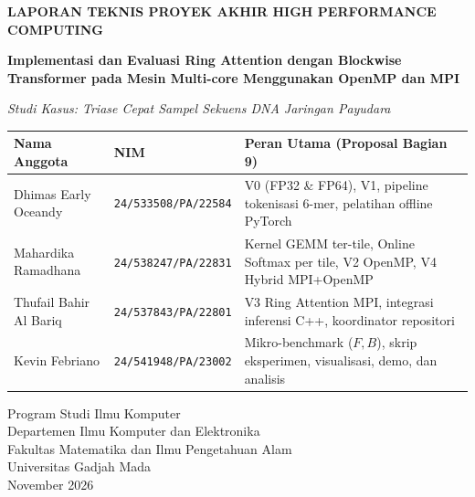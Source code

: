 \documentclass[11pt,a4paper]{article}
\begin{document}
\begin{titlepage}
\centering
\vspace*{1.5cm}
{\large\textbf{LAPORAN TEKNIS PROYEK AKHIR HIGH PERFORMANCE COMPUTING}\par}
\vspace{1.2cm}
{\LARGE\bfseries Implementasi dan Evaluasi Ring Attention dengan Blockwise Transformer pada Mesin Multi-core Menggunakan OpenMP dan MPI\par}
\vspace{0.5cm}
{\Large\itshape Studi Kasus: Triase Cepat Sampel Sekuens DNA Jaringan Payudara\par}
\vspace{1.8cm}

\begin{tabular}{llp{7.2cm}}
\toprule
\textbf{Nama Anggota} & \textbf{NIM} & \textbf{Peran Utama (Proposal Bagian 9)} \\
\midrule
Dhimas Early Oceandy & \texttt{24/533508/PA/22584} & V0 (FP32 \& FP64), V1, pipeline tokenisasi 6-mer, pelatihan offline PyTorch \\
Mahardika Ramadhana & \texttt{24/538247/PA/22831} & Kernel GEMM ter-tile, Online Softmax per tile, V2 OpenMP, V4 Hybrid MPI+OpenMP \\
Thufail Bahir Al Bariq & \texttt{24/537843/PA/22801} & V3 Ring Attention MPI, integrasi inferensi C++, koordinator repositori \\
Kevin Febriano & \texttt{24/541948/PA/23002} & Mikro-benchmark ($F, B$), skrip eksperimen, visualisasi, demo, dan analisis \\
\bottomrule
\end{tabular}

\vfill
{\large
Program Studi Ilmu Komputer\\
Departemen Ilmu Komputer dan Elektronika\\
Fakultas Matematika dan Ilmu Pengetahuan Alam\\
Universitas Gadjah Mada\\
November 2026
\par}
\end{titlepage}
\end{document}
